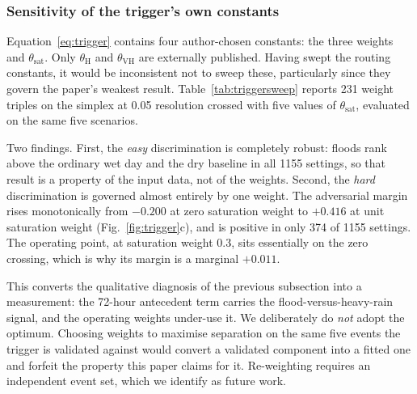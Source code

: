 \documentclass[10pt,twocolumn]{article}
\begin{document}
\subsubsection*{Sensitivity of the trigger's own constants}
\label{sec:res-trigger-sweep}
Equation~\eqref{eq:trigger} contains four author-chosen constants: the three
weights and $\theta_{\mathrm{sat}}$. Only $\theta_{\mathrm{H}}$ and
$\theta_{\mathrm{VH}}$ are externally published. Having swept the routing
constants, it would be inconsistent not to sweep these, particularly since they
govern the paper's weakest result. Table~\ref{tab:triggersweep} reports 231
weight triples on the simplex at 0.05 resolution crossed with five values of
$\theta_{\mathrm{sat}}$, evaluated on the same five scenarios.

Two findings. First, the \emph{easy} discrimination is completely robust: floods
rank above the ordinary wet day and the dry baseline in all \num{1155} settings,
so that result is a property of the input data, not of the weights.
Second, the \emph{hard} discrimination is governed almost entirely by one weight.
The adversarial margin rises monotonically from $-0.200$ at zero saturation
weight to $+0.416$ at unit saturation weight
(Fig.~\ref{fig:trigger}c), and is positive in only 374 of \num{1155} settings.
The operating point, at saturation weight 0.3, sits essentially on the zero
crossing, which is why its margin is a marginal $+0.011$.

This converts the qualitative diagnosis of the previous subsection into a
measurement: the 72-hour antecedent term carries the flood-versus-heavy-rain
signal, and the operating weights under-use it. We deliberately do \emph{not}
adopt the optimum. Choosing weights to maximise separation on the same five
events the trigger is validated against would convert a validated component into
a fitted one and forfeit the property this paper claims for it. Re-weighting
requires an independent event set, which we identify as future work.
\end{document}

